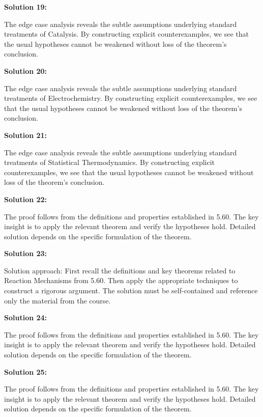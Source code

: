 \documentclass[12pt,a4paper]{exam}
\begin{document}
\vspace{0.5cm}

\textbf{Solution 19:}

The edge case analysis reveals the subtle assumptions underlying standard treatments of Catalysis. By constructing explicit counterexamples, we see that the usual hypotheses cannot be weakened without loss of the theorem's conclusion.

\vspace{0.5cm}

\textbf{Solution 20:}

The edge case analysis reveals the subtle assumptions underlying standard treatments of Electrochemistry. By constructing explicit counterexamples, we see that the usual hypotheses cannot be weakened without loss of the theorem's conclusion.

\vspace{0.5cm}

\textbf{Solution 21:}

The edge case analysis reveals the subtle assumptions underlying standard treatments of Statistical Thermodynamics. By constructing explicit counterexamples, we see that the usual hypotheses cannot be weakened without loss of the theorem's conclusion.

\vspace{0.5cm}

\textbf{Solution 22:}

The proof follows from the definitions and properties established in 5.60. The key insight is to apply the relevant theorem and verify the hypotheses hold. Detailed solution depends on the specific formulation of the theorem.

\vspace{0.5cm}

\textbf{Solution 23:}

Solution approach: First recall the definitions and key theorems related to Reaction Mechanisms from 5.60. Then apply the appropriate techniques to construct a rigorous argument. The solution must be self-contained and reference only the material from the course.

\vspace{0.5cm}

\textbf{Solution 24:}

The proof follows from the definitions and properties established in 5.60. The key insight is to apply the relevant theorem and verify the hypotheses hold. Detailed solution depends on the specific formulation of the theorem.

\vspace{0.5cm}

\textbf{Solution 25:}

The proof follows from the definitions and properties established in 5.60. The key insight is to apply the relevant theorem and verify the hypotheses hold. Detailed solution depends on the specific formulation of the theorem.

\vspace{0.5cm}
\end{document}
